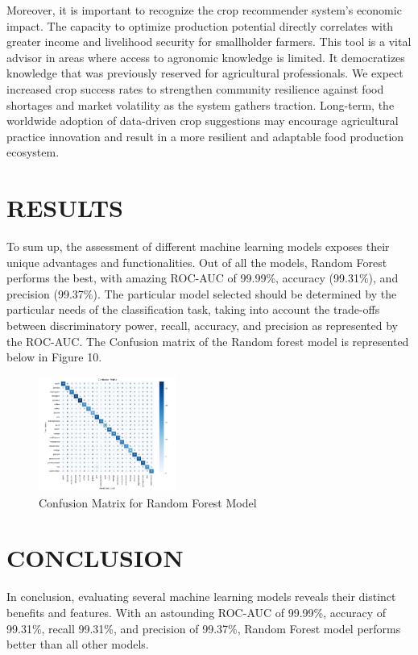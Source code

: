 Moreover, it is important to recognize the crop recommender system's economic impact. The capacity to optimize production potential directly correlates with greater income and livelihood security for smallholder farmers. This tool is a vital advisor in areas where access to agronomic knowledge is limited. It democratizes knowledge that was previously reserved for agricultural professionals. We expect increased crop success rates to strengthen community resilience against food shortages and market volatility as the system gathers traction. Long-term, the worldwide adoption of data-driven crop suggestions may encourage agricultural practice innovation and result in a more resilient and adaptable food production ecosystem.

\section{RESULTS}
To sum up, the assessment of different machine learning models exposes their unique advantages and functionalities. Out of all the models, Random Forest performs the best, with amazing ROC-AUC of 99.99\%, accuracy (99.31\%), and precision (99.37\%). The particular model selected should be determined by the particular needs of the classification task, taking into account the trade-offs between discriminatory power, recall, accuracy, and precision as represented by the ROC-AUC. The Confusion matrix of the Random forest model is represented below in Figure 10.

 \begin{figure}[t]
    \centering
    \includegraphics[width=0.4\textwidth]{visual 7.png}
    \caption{Confusion Matrix for Random Forest Model}
    \label{fig:my_label}

\end{figure}










\section{CONCLUSION}
In conclusion, evaluating several machine learning models reveals their distinct benefits and features. With an astounding ROC-AUC of 99.99\%, accuracy of 99.31\%, recall 99.31\%, and precision of 99.37\%, Random Forest model performs better than all other models.
